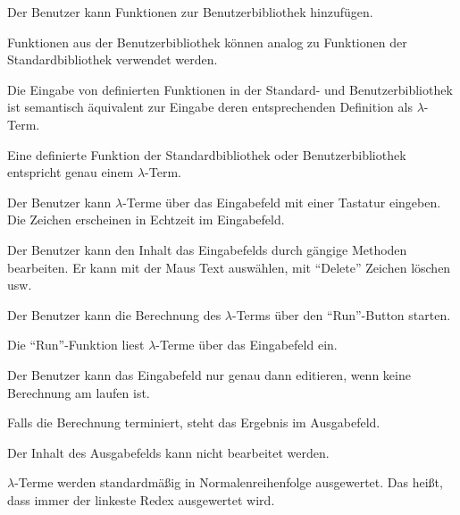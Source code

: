 \documentclass[parskip=full,11pt,twoside]{scrartcl}
\begin{document}
Der Benutzer kann Funktionen zur Benutzerbibliothek hinzufügen.

Funktionen aus der Benutzerbibliothek können analog zu Funktionen der Standardbibliothek verwendet werden.

Die Eingabe von definierten Funktionen in der Standard- und Benutzerbibliothek ist semantisch äquivalent zur Eingabe deren entsprechenden Definition als $\lambda$-Term.

Eine definierte Funktion der Standardbibliothek oder Benutzerbibliothek entspricht genau einem $\lambda$-Term.

Der Benutzer kann $\lambda$-Terme über das Eingabefeld mit einer Tastatur eingeben. Die Zeichen erscheinen in Echtzeit im Eingabefeld.

Der Benutzer kann den Inhalt das Eingabefelds durch gängige Methoden bearbeiten.
Er kann mit der Maus Text auswählen, mit \enquote{Delete} Zeichen löschen usw.

Der Benutzer kann die Berechnung des $\lambda$-Terms über den \enquote{Run}-Button starten.

Die \enquote{Run}-Funktion liest $\lambda$-Terme über das Eingabefeld ein.

Der Benutzer kann das Eingabefeld nur genau dann editieren, wenn keine Berechnung am laufen ist.

Falls die Berechnung terminiert, steht das Ergebnis im Ausgabefeld.

Der Inhalt des Ausgabefelds kann nicht bearbeitet werden.

$\lambda$-Terme werden standardmäßig in Normalenreihenfolge ausgewertet.
Das heißt, dass immer der linkeste Redex ausgewertet wird.
\end{document}
